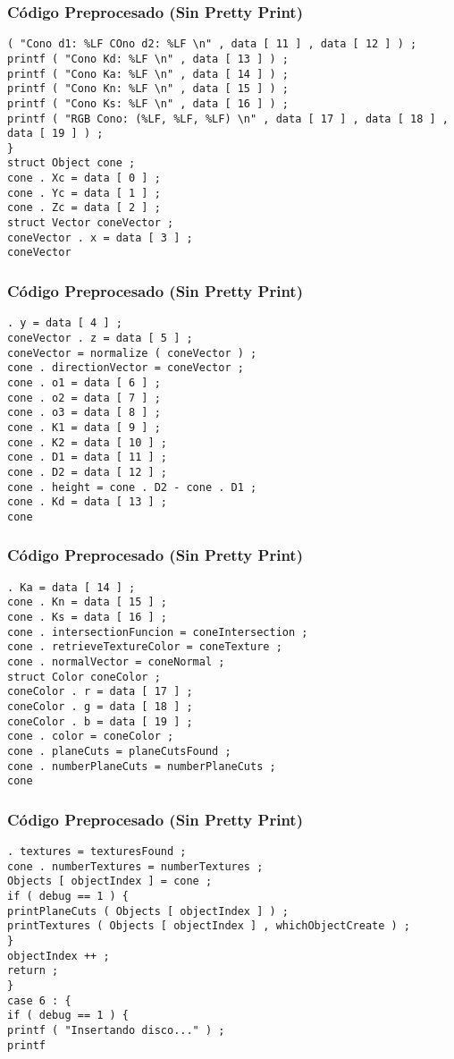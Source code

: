 \documentclass{beamer}
\begin{document}
\begin{frame}[fragile]
\frametitle{C\'odigo Preprocesado (Sin Pretty Print)}
\begin{lstlisting}[style=CStyle]
( "Cono d1: %LF COno d2: %LF \n" , data [ 11 ] , data [ 12 ] ) ; 
printf ( "Cono Kd: %LF \n" , data [ 13 ] ) ; 
printf ( "Cono Ka: %LF \n" , data [ 14 ] ) ; 
printf ( "Cono Kn: %LF \n" , data [ 15 ] ) ; 
printf ( "Cono Ks: %LF \n" , data [ 16 ] ) ; 
printf ( "RGB Cono: (%LF, %LF, %LF) \n" , data [ 17 ] , data [ 18 ] , data [ 19 ] ) ; 
} 
struct Object cone ; 
cone . Xc = data [ 0 ] ; 
cone . Yc = data [ 1 ] ; 
cone . Zc = data [ 2 ] ; 
struct Vector coneVector ; 
coneVector . x = data [ 3 ] ; 
coneVector \end{lstlisting}
\end{frame}
\begin{frame}[fragile]
\frametitle{C\'odigo Preprocesado (Sin Pretty Print)}
\begin{lstlisting}[style=CStyle]
. y = data [ 4 ] ; 
coneVector . z = data [ 5 ] ; 
coneVector = normalize ( coneVector ) ; 
cone . directionVector = coneVector ; 
cone . o1 = data [ 6 ] ; 
cone . o2 = data [ 7 ] ; 
cone . o3 = data [ 8 ] ; 
cone . K1 = data [ 9 ] ; 
cone . K2 = data [ 10 ] ; 
cone . D1 = data [ 11 ] ; 
cone . D2 = data [ 12 ] ; 
cone . height = cone . D2 - cone . D1 ; 
cone . Kd = data [ 13 ] ; 
cone \end{lstlisting}
\end{frame}
\begin{frame}[fragile]
\frametitle{C\'odigo Preprocesado (Sin Pretty Print)}
\begin{lstlisting}[style=CStyle]
. Ka = data [ 14 ] ; 
cone . Kn = data [ 15 ] ; 
cone . Ks = data [ 16 ] ; 
cone . intersectionFuncion = coneIntersection ; 
cone . retrieveTextureColor = coneTexture ; 
cone . normalVector = coneNormal ; 
struct Color coneColor ; 
coneColor . r = data [ 17 ] ; 
coneColor . g = data [ 18 ] ; 
coneColor . b = data [ 19 ] ; 
cone . color = coneColor ; 
cone . planeCuts = planeCutsFound ; 
cone . numberPlaneCuts = numberPlaneCuts ; 
cone \end{lstlisting}
\end{frame}
\begin{frame}[fragile]
\frametitle{C\'odigo Preprocesado (Sin Pretty Print)}
\begin{lstlisting}[style=CStyle]
. textures = texturesFound ; 
cone . numberTextures = numberTextures ; 
Objects [ objectIndex ] = cone ; 
if ( debug == 1 ) { 
printPlaneCuts ( Objects [ objectIndex ] ) ; 
printTextures ( Objects [ objectIndex ] , whichObjectCreate ) ; 
} 
objectIndex ++ ; 
return ; 
} 
case 6 : { 
if ( debug == 1 ) { 
printf ( "Insertando disco..." ) ; 
printf \end{lstlisting}
\end{frame}
\end{document}
